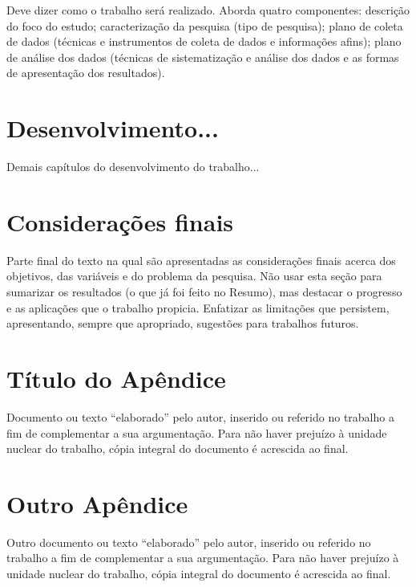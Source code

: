 \documentclass{unemat-tex}
\begin{document}
	Deve dizer como o trabalho será realizado. Aborda quatro componentes: descrição do foco do estudo; caracterização da pesquisa (tipo de pesquisa); plano de coleta de dados (técnicas e instrumentos de coleta de dados e informações afins); plano de análise dos dados (técnicas de sistematização e análise dos dados e as formas de apresentação dos resultados).
	
\chapter{Desenvolvimento...}
	
	Demais capítulos do desenvolvimento do trabalho...

\chapter{Considerações finais}

	Parte final do texto na qual são apresentadas as considerações finais acerca dos objetivos, das variáveis e do problema da pesquisa. Não usar esta seção para sumarizar os resultados (o que já foi feito no Resumo), mas destacar o progresso e as aplicações que o trabalho propicia. Enfatizar as limitações que persistem, apresentando, sempre que apropriado, sugestões para trabalhos futuros.



\postextual



\begin{apendicesenv}
	
	\partapendices
	
	\chapter{Título do Apêndice}
	
		Documento ou texto “elaborado” pelo autor, inserido ou referido no trabalho a fim de complementar a sua argumentação. Para	não haver prejuízo à unidade nuclear do	trabalho, cópia integral do documento é	acrescida ao final.
		
	\chapter{Outro Apêndice}
	
		Outro documento ou texto “elaborado” pelo autor, inserido ou referido no trabalho a fim de complementar a sua argumentação. Para	não haver prejuízo à unidade nuclear do	trabalho, cópia integral do documento é	acrescida ao final.
	
	
\end{apendicesenv}
\end{document}

